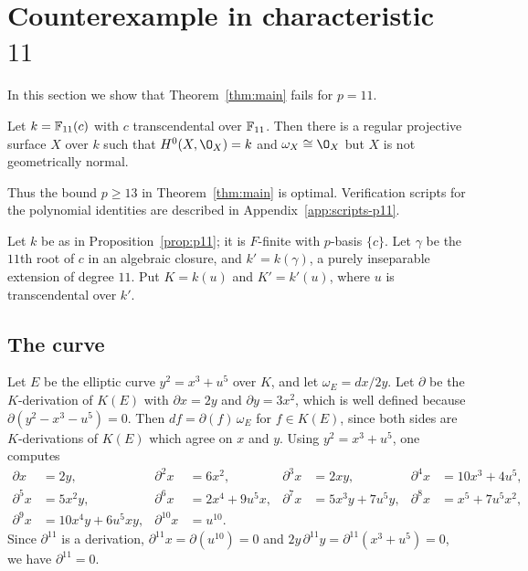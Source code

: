 \section{Counterexample in characteristic $11$}\label{sec:p11}
In this section we show that Theorem~\ref{thm:main} fails for $p = 11$.

\begin{proposition}\label{prop:p11}
Let $k = \mathbb{F}_{11}(c)$ with $c$ transcendental over $\mathbb{F}_{11}$.
Then there is a regular projective surface $X$ over $k$ such that $H^0(X,\O_X) = k$ and $\omega_X\cong\O_X$ but $X$ is not geometrically normal.
\end{proposition}

Thus the bound $p\geq 13$ in Theorem~\ref{thm:main} is optimal.
Verification scripts for the polynomial identities are described in Appendix~\ref{app:scripts-p11}.

Let $k$ be as in Proposition~\ref{prop:p11}; it is $F$-finite with $p$-basis $\{c\}$.
Let $\gamma$ be the $11$th root of $c$ in an algebraic closure, and $k' = k(\gamma)$, a purely inseparable extension of degree $11$.
Put $K = k(u)$ and $K' = k'(u)$, where $u$ is transcendental over $k'$.

\subsection{The curve}

Let $E$ be the elliptic curve $y^2 = x^3+u^5$ over $K$, and let $\omega_E = dx/2y$.
Let $\partial$ be the $K$-derivation of $K(E)$ with $\partial x = 2y$ and $\partial y = 3x^2$, which is well defined because $\partial(y^2-x^3-u^5) = 0$.
Then $df = \partial(f)\,\omega_E$ for $f\in K(E)$, since both sides are $K$-derivations of $K(E)$ which agree on $x$ and $y$.
Using $y^2 = x^3+u^5$, one computes
\begin{equation}\label{eq:p11-derivatives}
\begin{aligned}
  \partial x &= 2y, & \partial^2x &= 6x^2, & \partial^3x &= 2xy, & \partial^4x &= 10x^3+4u^5,\\
  \partial^5x &= 5x^2y, & \partial^6x &= 2x^4+9u^5x, & \partial^7x &= 5x^3y+7u^5y, & \partial^8x &= x^5+7u^5x^2,\\
  \partial^9x &= 10x^4y+6u^5xy, & \partial^{10}x &= u^{10}.
\end{aligned}
\end{equation}
Since $\partial^{11}$ is a derivation, $\partial^{11}x = \partial(u^{10}) = 0$ and $2y\,\partial^{11}y = \partial^{11}(x^3+u^5) = 0$, we have $\partial^{11} = 0$.

